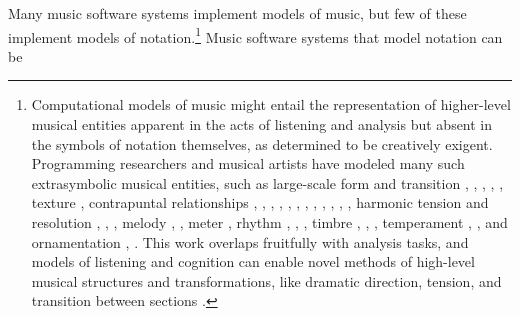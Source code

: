 \documentclass{article}
\begin{document}
Many music software systems implement models of music, but few of these
implement models of notation.\footnote{Computational models of music might
entail the representation of higher-level musical entities apparent in the acts
of listening and analysis but absent in the symbols of notation themselves, as
determined to be creatively exigent. Programming researchers and musical
artists have modeled many such extrasymbolic musical entities, such as
large-scale form and transition \cite{polansky1991morphological},
\cite{uno1994temporal}, \cite{dobrian1995algorithmic}, \cite{abrams1999higher},
\cite{Yoo1983}, texture \cite{Horenstein:2004kx}, contrapuntal relationships
\cite{Boenn:2009oq}, \cite{Acevedo2005}, \cite{Anders:2011kl},
\cite{Balser:1990tg}, \cite{Jones:2000hc}, \cite{uno1994temporal},
\cite{Bell:1995ij}, \cite{farbood2001analysis}, \cite{Cope:2002fv},
\cite{Laurson:2005dz}, \cite{Polansky:2011fu}, \cite{Ebcioglu:1980kl}, harmonic
tension and resolution \cite{Melo2003}, \cite{Wiggins1999},
\cite{Foster:1995qa}, melody \cite{Hornel:1993mi}, \cite{Smith:1992pi}, meter
\cite{Hamanaka:2005ff}, rhythm \cite{Nauert2007}, \cite{Degazio:1996lh},
\cite{Collins:2003bs}, timbre \cite{Xenakis:1991fu}, \cite{Creasey:1996ye},
\cite{Osaka2004}, temperament \cite{Seymour:2007qo}, \cite{Graf:2006il}, and
ornamentation \cite{Ariza:2003zt}, \cite{Chico-Topfer:1998jl}. This work
overlaps fruitfully with analysis tasks, and models of listening and cognition
can enable novel methods of high-level musical structures and transformations,
like dramatic direction, tension, and transition between sections
\cite[108]{Collins2009}.} Music software systems that model notation can be
\end{document}
